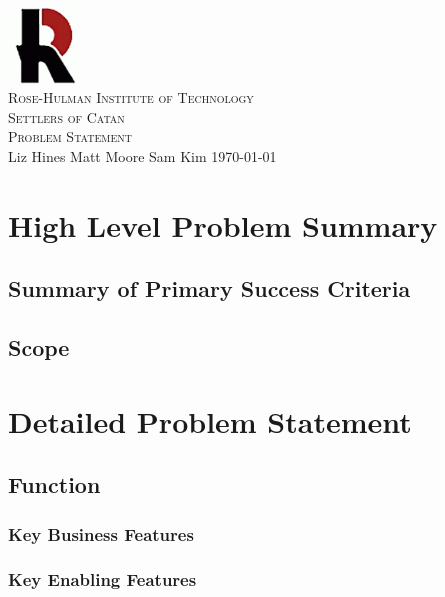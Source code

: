 \documentclass[12pt]{article}
\begin{document}
\begin{titlepage}
\begin{center}
\includegraphics[width=0.15\textwidth]{Images/logo}\\[1cm]
\textsc{\LARGE Rose-Hulman Institute of Technology}\\[1.5cm]
\textsc{\Large Settlers of Catan}\\[1.0cm]
\textsc{\Large Problem Statement}\\[1.0cm]
\Large Liz Hines \hspace{0.2cm}  Matt Moore \hspace{0.2cm} Sam	Kim
\vfill
\large \today
\end{center}
\end{titlepage}

\newpage
{\small \tableofcontents}
\newpage

\section*{High Level Problem Summary}

\subsection*{Summary of Primary Success Criteria}

\subsection*{Scope}

\section*{Detailed Problem Statement}

\subsection*{Function}

\subsubsection*{Key Business Features}

\subsubsection*{Key Enabling Features}
\end{document}
